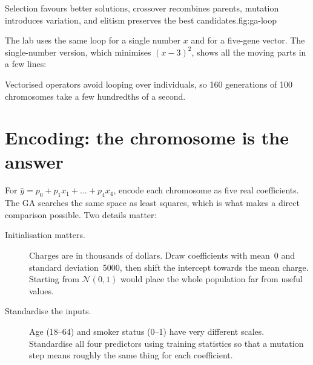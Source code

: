 \begin{utpfig}{Selection favours better solutions, crossover recombines parents, mutation introduces variation, and elitism preserves the best candidates.}{fig:ga-loop}
\end{utpfig}

The lab uses the same loop for a single number $x$ and for a five-gene vector. The single-number version, which minimises $(x-3)^2$, shows all the moving parts in a few lines:



Vectorised operators avoid looping over individuals, so 160 generations of 100 chromosomes take a few hundredths of a second.

\section{Encoding: the chromosome is the answer}

For $\hat y=p_0+p_1x_1+\dots+p_4x_4$, encode each chromosome as five real coefficients. The GA searches the same space as least squares, which is what makes a direct comparison possible. Two details matter:

\begin{description}
  \item[Initialisation matters.] Charges are in thousands of dollars. Draw coefficients with mean~0 and standard deviation~5000, then shift the intercept towards the mean charge. Starting from $\mathcal N(0,1)$ would place the whole population far from useful values.
  \item[Standardise the inputs.] Age (18--64) and smoker status (0--1) have very different scales. Standardise all four predictors using training statistics so that a mutation step means roughly the same thing for each coefficient.
\end{description}

